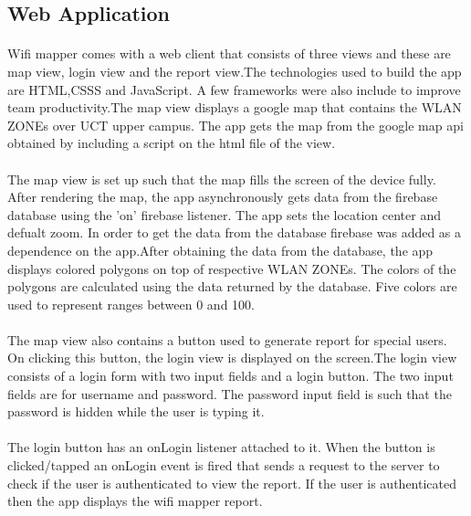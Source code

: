\subsection*{Web Application}
\paragraph{}Wifi mapper comes with a web client that consists of three views and these are map view, login view and the report view.The technologies used to build the app are HTML,CSSS and JavaScript. A few frameworks were also include to improve team productivity.The map view displays a google map that contains the WLAN ZONEs over UCT upper campus. The app gets the map from the google map api obtained by including a script on the html file of the view.

\paragraph{}The map view is set up such that the map fills the screen of the device fully. After rendering the map, the app asynchronously gets data from the firebase database using the 'on' firebase listener. The app sets the location center and defualt zoom. In order to get the data from the database firebase was added as a dependence on the app.After obtaining the data from the database, the app displays colored polygons on top of respective WLAN ZONEs. The colors of the polygons are calculated using the data returned by the database. Five colors are used to represent ranges between 0 and 100. 

\paragraph{}The map view also contains a button used to generate report for special users. On clicking this button, the login view is displayed on the screen.The login view consists of a login form with two input fields and a login button. The two input fields are for username and password. The password input field is such that the password is hidden while the user is typing it. 

\paragraph{}The login button has an onLogin listener attached to it. When the button is clicked/tapped an onLogin event is fired that sends a request to the server to check if the user is authenticated to view the report. If the user is authenticated then the app displays the wifi mapper report.

